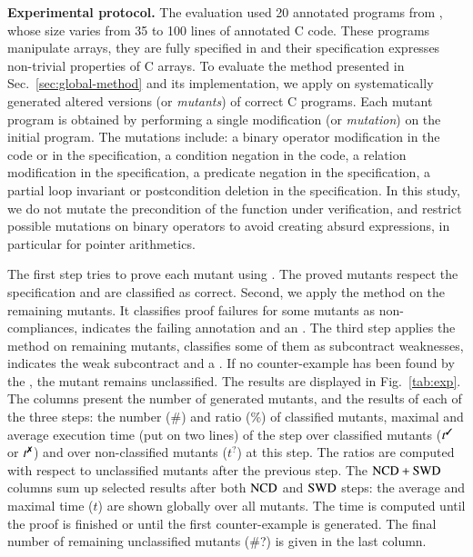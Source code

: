 \textbf{Experimental protocol.} 
The evaluation used 20 annotated programs from \cite{ACSLbyExample},
whose size varies from 35 to 100 lines of annotated C code.
These programs manipulate arrays, they are fully specified in \acsl and their
specification expresses non-trivial properties of C arrays. 
To evaluate the method
presented in Sec.~\ref{sec:global-method} and its implementation, we apply \stady on systematically
generated altered  versions (or \emph{mutants}) of correct C programs.
Each mutant program is obtained by performing a single modification (or \emph{mutation}) on the
initial program.
The mutations include: a binary operator modification in the code or in the
specification, a condition negation in the code, a relation modification in the
specification, a predicate negation in the specification, a partial loop invariant or
postcondition deletion in the specification.
In this study, we do not mutate the precondition of the function under verification, 
and restrict possible mutations on binary operators to avoid creating absurd
expressions, in particular for pointer arithmetics.


The first step tries to prove each mutant using \Wp. 
The proved mutants respect the specification and are classified as correct. 
Second, we apply the \NCD method on the remaining mutants.
It classifies proof failures for some mutants as non-compliances, indicates the failing annotation and an \NCCE.
The third step applies the \CWD method on remaining mutants,
classifies some of them as subcontract weaknesses, indicates the weak subcontract and a \CWCE.
If no counter-example has been found by the \CWD, the mutant remains 
unclassified. %
The results are displayed in Fig.~\ref{tab:exp}.
The columns 
present the number of generated mutants, and the results of each of the three
steps: the number (\#) and ratio (\%) of classified mutants,
maximal and average execution time (put on two lines) of the step
over classified mutants ($t^\text{\ok}$ or $t^\text{\ko}$) and over non-classified
mutants ($t^\text{?}$) at this step.
The ratios are computed with respect to unclassified mutants after the previous step.
The $\mathrm{NCD}+\mathrm{SWD}$ columns sum up selected results after both $\mathrm{NCD}$ and $\mathrm{SWD}$ steps:
the average and maximal time ($t$) are shown globally over all mutants.
The time is computed until the proof is finished or until the first counter-example is generated.
The final number of remaining unclassified mutants (\#?) is given in the last column.


